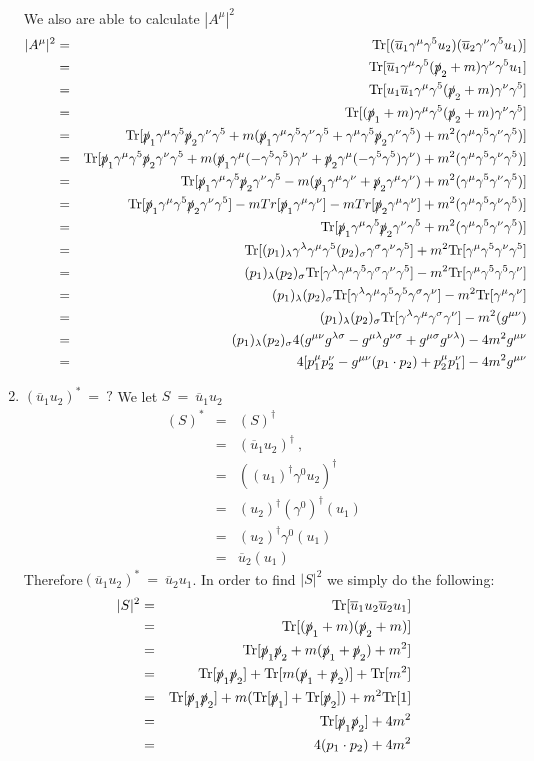 \documentclass[12pt]{article}
\def \bea{\begin{eqnarray}}
\def \eea{\end{eqnarray}}
\def \Tr{{\rm Tr}}
\def \nn{\nonumber}
\def \nl{\nn \\}
\def \ou{\overline{u}}
\def \ga{\gamma}
\def \la{\lambda}
\def \si{\sigma}
\begin{document}
\begin{enumerate}
We also are able to calculate $|A^\mu|^2$
\bea
|A^{\mu}|^2 &=& \Tr[(\ou_1\ga^\mu \ga^5 u_2)(\ou_2 \ga^\nu \ga^5 u_1)] \\
&=& \Tr[\ou_1\ga^\mu \ga^5 (\slashed{p}_2+m) \ga^\nu \ga^5 u_1]  \nl
&=&\Tr[u_1\ou_1\ga^\mu \ga^5 (\slashed{p}_2+m) \ga^\nu \ga^5 ]\nl
&=&\Tr[(\slashed{p}_1+m)\ga^\mu \ga^5 (\slashed{p}_2+m) \ga^\nu \ga^5 ]\nl
&=& \Tr[\slashed{p}_1\ga^\mu\ga^5 \slashed{p}_2\ga^\nu \ga^5 + m( \slashed{p}_1\ga^\mu\ga^5\ga^\nu \ga^5 +\ga^\mu\ga^5 \slashed{p}_2\ga^\nu \ga^5) + m^2(\ga^\mu\ga^5\ga^\nu \ga^5)] \nl
&=&\Tr[\slashed{p}_1\ga^\mu\ga^5 \slashed{p}_2\ga^\nu \ga^5 + m( \slashed{p}_1\ga^\mu(-\ga^5 \ga^5)\ga^\nu +\slashed{p}_2\ga^\mu(-\ga^5\ga^5) \ga^\nu ) + m^2(\ga^\mu\ga^5\ga^\nu \ga^5)] \nl
&=&\Tr[\slashed{p}_1\ga^\mu\ga^5 \slashed{p}_2\ga^\nu \ga^5 - m( \slashed{p}_1\ga^\mu\ga^\nu +\slashed{p}_2\ga^\mu\ga^\nu ) + m^2(\ga^\mu\ga^5\ga^\nu \ga^5)] \nl
&=&\Tr[\slashed{p}_1\ga^\mu\ga^5 \slashed{p}_2\ga^\nu \ga^5] -mTr[ \slashed{p}_1\ga^\mu\ga^\nu]-mTr[ \slashed{p}_2\ga^\mu\ga^\nu]+ m^2(\ga^\mu\ga^5\ga^\nu \ga^5)] \nl
&=&\Tr[\slashed{p}_1\ga^\mu\ga^5 \slashed{p}_2\ga^\nu \ga^5 + m^2(\ga^\mu\ga^5\ga^\nu \ga^5)] \nl
&=& \Tr[(p_1)_\la\ga^\la\ga^\mu\ga^5 (p_2)_\si\ga^\si\ga^\nu \ga^5] + m^2\Tr[\ga^\mu\ga^5\ga^\nu \ga^5]\nl
&=& (p_1)_\la(p_2)_\si \Tr[\ga^\la\ga^\mu\ga^5 \ga^\si\ga^\nu \ga^5] - m^2\Tr[\ga^\mu\ga^5\ga^5 \ga^\nu]\nl
&=& (p_1)_\la(p_2)_\si \Tr[\ga^\la\ga^\mu\ga^5\ga^5 \ga^\si\ga^\nu] - m^2\Tr[\ga^\mu\ga^\nu]\nl
&=& (p_1)_\la(p_2)_\si \Tr[\ga^\la\ga^\mu\ga^\si\ga^\nu] - m^2(g^{\mu\nu})\nl
&=& (p_1)_\la(p_2)_\si 4(g^{\mu\nu}g^{\la\si} - g^{\mu\la} g^{\nu\si} + g^{\mu\si}g^{\nu\la}) - 4m^2g^{\mu\nu}\nl
&=& 4[p_1^\mu p_2^\nu - g^{\mu\nu}(p_1 \cdot p_2) + p_2^\mu p_1^\nu] - 4m^2g^{\mu\nu} 
\eea

\item $ (\ou_1 u_2)^* ~=~ ?$
We let $S ~=~ \ou_1 u_2$
\bea
(S)^* &=& (S)^\dag \\
&=& (\ou_1 u_2)^\dag ~,~~ \nl
&=& ((u_1)^\dag\ga^0 u_2)^\dag \nl
&=& (u_2)^\dag(\ga^0)^\dag(u_1)\nl
&=& (u_2)^\dag\ga^0(u_1)\nl
&=& \ou_2(u_1)
\eea
Therefore$(\ou_1 u_2)^* ~=~ \ou_2 u_1$.
In order to find $|S|^2$ we simply do the following:
\bea
|S|^2&=& \Tr[\ou_1 u_2 \ou_2 u_1]  \\
&=& \Tr[(\slashed{p}_1+m)(\slashed{p}_2+m)] \nl
&=& \Tr[\slashed{p}_1\slashed{p}_2+m(\slashed{p}_1+\slashed{p}_2)+m^2]\nl
&=& \Tr[\slashed{p}_1\slashed{p}_2]+\Tr[m(\slashed{p}_1+\slashed{p}_2)]+\Tr[m^2] \nl
&=& \Tr[\slashed{p}_1\slashed{p}_2]+m(\Tr[\slashed{p}_1]+\Tr[\slashed{p}_2])+m^2\Tr[1] \nl
&=& \Tr[\slashed{p}_1\slashed{p}_2]+4m^2 \nl
&=& 4(p_1 \cdot p_2)+4m^2
\eea


\end{enumerate}
\end{document}
